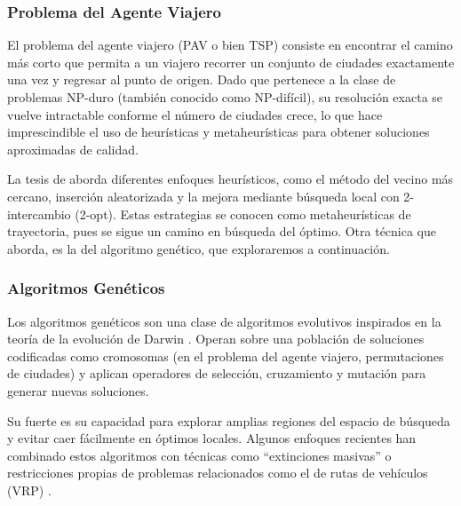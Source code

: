 \documentclass[main.tex]{subfiles}
\begin{document}
\begin{cajaEnunciado}
    \subsubsection*{Problema del Agente Viajero}
\end{cajaEnunciado}

El problema del agente viajero (PAV o bien TSP) consiste en encontrar el camino
más corto que permita a un viajero recorrer un conjunto de ciudades exactamente
una vez y regresar al punto de origen. Dado que pertenece a la clase de
problemas NP-duro (también conocido como NP-difícil), su resolución exacta se
vuelve intractable conforme el número de ciudades crece, lo que hace
imprescindible el uso de heurísticas y metaheurísticas para obtener soluciones
aproximadas de calidad. \parencite{pav_tesis} \parencite{cormen}

La tesis de \cite{pav_tesis} aborda diferentes enfoques heurísticos, como el
método del vecino más cercano, inserción aleatorizada y la mejora mediante
búsqueda local con 2-intercambio (2-opt). Estas estrategias se conocen como
metaheurísticas de trayectoria, pues se sigue un camino en búsqueda del óptimo.
Otra técnica que aborda, es la del algoritmo genético, que exploraremos a
continuación.

\begin{cajaEnunciado}
    \subsubsection*{Algoritmos Genéticos}
\end{cajaEnunciado}

Los algoritmos genéticos son una clase de algoritmos evolutivos inspirados en
la teoría de la evolución de Darwin \parencite{genintro}. Operan sobre una
población de soluciones codificadas como cromosomas (en el problema del agente
viajero, permutaciones de ciudades) y aplican operadores de selección,
cruzamiento y mutación para generar nuevas soluciones.

Su fuerte es su capacidad para explorar amplias regiones del espacio de
búsqueda y evitar caer fácilmente en óptimos locales. Algunos enfoques
recientes han combinado estos algoritmos con técnicas como “extinciones
masivas” \parencite{tsp_ext} o restricciones propias de problemas relacionados
como el de rutas de vehículos (VRP) \parencite{prv_gen}.
\end{document}
